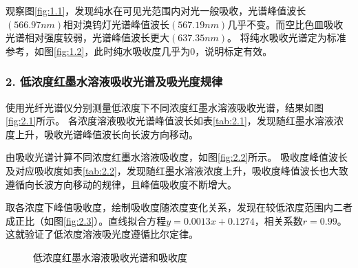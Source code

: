 \documentclass[12pt,a4paper,UTF8]{ctexart}
\begin{document}
观察图\ref{fig:1.1}，发现纯水在可见光范围内对光一般吸收，光谱峰值波长$(566.97 nm)$相对溴钨灯光谱峰值波长$(567.19 nm)$几乎不变。而空比色皿吸收光谱相对强度较弱，光谱峰值波长更大$(637.35 nm)$。
将纯水吸收光谱定为标准参考，如图\ref{fig:1.2}，此时纯水吸收度几乎为$0$，说明标定有效。

\subsubsection*{2. 低浓度红墨水溶液吸收光谱及吸光度规律}
使用光纤光谱仪分别测量低浓度下不同浓度红墨水溶液吸收光谱，结果如图\ref{fig:2.1}所示。
各浓度溶液吸收光谱峰值波长如表\ref{tab:2.1}，发现随红墨水溶液浓度上升，吸收光谱峰值波长向长波方向移动。

由吸收光谱计算不同浓度红墨水溶液吸收度，如图\ref{fig:2.2}所示。
吸收度峰值波长及对应吸收度如表\ref{tab:2.2}，发现随红墨水溶液浓度上升，吸收度峰值波长也大致遵循向长波方向移动的规律，且峰值吸收度不断增大。

取各浓度下峰值吸收度，绘制吸收度随浓度变化关系，发现在较低浓度范围内二者成正比（如图\ref{fig:2.3}）。直线拟合方程$y = 0.0013x+0.1274$，相关系数$r = 0.99$。
这就验证了低浓度溶液吸光度遵循比尔定律。                                            
\begin{figure}[htbp]
	\centering
	\caption{低浓度红墨水溶液吸收光谱和吸收度}
\end{figure}
\end{document}
